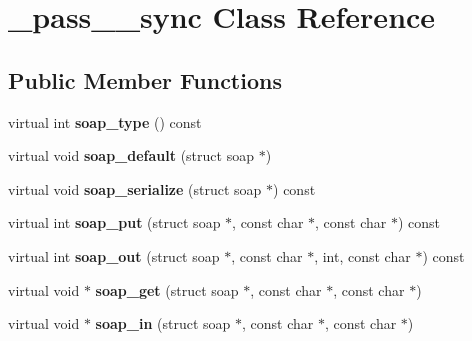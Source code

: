 \hypertarget{class__pass____sync}{
\section{\_\-pass\_\-\_\-sync Class Reference}
\label{class__pass____sync}
}
\subsection*{Public Member Functions}
\begin{DoxyCompactItemize}
\item 
\hypertarget{class__pass____sync_a051c00652131ab48806cddf26ed61137}{
virtual int {\bfseries soap\_\-type} () const }
\label{class__pass____sync_a051c00652131ab48806cddf26ed61137}

\item 
\hypertarget{class__pass____sync_aa42ae544c6de9cc9641846c8b0f888a6}{
virtual void {\bfseries soap\_\-default} (struct soap $\ast$)}
\label{class__pass____sync_aa42ae544c6de9cc9641846c8b0f888a6}

\item 
\hypertarget{class__pass____sync_ae08868b1637c8b0b9ff9d6baee6f6726}{
virtual void {\bfseries soap\_\-serialize} (struct soap $\ast$) const }
\label{class__pass____sync_ae08868b1637c8b0b9ff9d6baee6f6726}

\item 
\hypertarget{class__pass____sync_a1fc713ec78d8a2cdd316c1cbdf38f8d6}{
virtual int {\bfseries soap\_\-put} (struct soap $\ast$, const char $\ast$, const char $\ast$) const }
\label{class__pass____sync_a1fc713ec78d8a2cdd316c1cbdf38f8d6}

\item 
\hypertarget{class__pass____sync_afc2f3d9d05bf7d8792ccbfd32567e939}{
virtual int {\bfseries soap\_\-out} (struct soap $\ast$, const char $\ast$, int, const char $\ast$) const }
\label{class__pass____sync_afc2f3d9d05bf7d8792ccbfd32567e939}

\item 
\hypertarget{class__pass____sync_a56a82cad3c57ffb2a7efe676f49a52c8}{
virtual void $\ast$ {\bfseries soap\_\-get} (struct soap $\ast$, const char $\ast$, const char $\ast$)}
\label{class__pass____sync_a56a82cad3c57ffb2a7efe676f49a52c8}

\item 
\hypertarget{class__pass____sync_a6ddeb6c1ec9120b487c5cbed633ef3d8}{
virtual void $\ast$ {\bfseries soap\_\-in} (struct soap $\ast$, const char $\ast$, const char $\ast$)}
\label{class__pass____sync_a6ddeb6c1ec9120b487c5cbed633ef3d8}

\end{DoxyCompactItemize}
